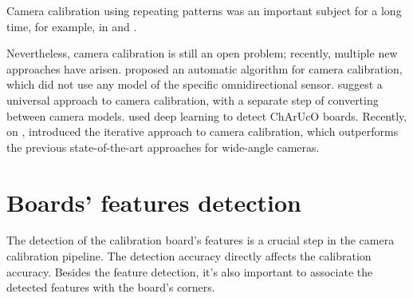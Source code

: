 Camera calibration using repeating patterns was an important subject for a long
time, for example, \cite{schaffalitzkyGeometricGroupingRepeated1998} in
\citeyear{schaffalitzkyGeometricGroupingRepeated1998} and
\cite{zhangFlexibleNewTechnique2000}.


Nevertheless, camera calibration is still an open problem; recently,
multiple new approaches have arisen.
\cite{scaramuzzaToolboxEasilyCalibrating2006} proposed an automatic algorithm
for camera calibration, which did not use any model of the specific omnidirectional
sensor.
\cite{lochmanBabelCalibUniversalApproach2021} suggest a universal approach
to camera calibration, with a separate step of converting between camera models.
\cite{huDeepChArUcoDark2019} used deep learning to detect ChArUcO boards.
Recently, on ,
\cite{duisterhofTartanCalibIterativeWideAngle2022} introduced the iterative
approach to camera calibration, which outperforms the previous state-of-the-art
approaches for wide-angle cameras.


\section{Boards' features detection}\label{sec:boards_features_detection}

The detection of the calibration board's features is a crucial step in the
camera calibration pipeline. The detection accuracy directly affects the
calibration accuracy. Besides the feature detection, it's also important to
associate the detected features with the board's corners.

